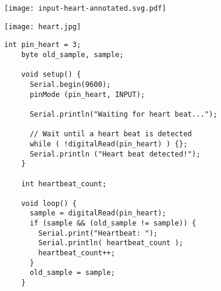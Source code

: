 \vspace{0.1in}
\begin{minipage}[t]{0.49\tw}
  \vspace{0pt}
  \texttt{[image: input-heart-annotated.svg.pdf]}

  \vspace{0pt}
  \texttt{[image: heart.jpg]}
\end{minipage}
\hfill
\begin{minipage}[t]{0.49\tw}
  \vspace{0.1in}
  \begin{Verbatim}[gobble=3,fontsize=\small]
    int pin_heart = 3;
    byte old_sample, sample;

    void setup() {
      Serial.begin(9600);
      pinMode (pin_heart, INPUT);

      Serial.println("Waiting for heart beat...");

      // Wait until a heart beat is detected
      while ( !digitalRead(pin_heart) ) {};
      Serial.println ("Heart beat detected!");
    }

    int heartbeat_count;

    void loop() {
      sample = digitalRead(pin_heart);
      if (sample && (old_sample != sample)) {
        Serial.print("Heartbeat: ");
        Serial.println( heartbeat_count );
        heartbeat_count++;
      }
      old_sample = sample;
    }

  \end{Verbatim}
\end{minipage}

